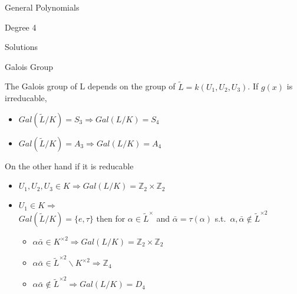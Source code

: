\documentclass[12pt, letterpaper]{article}
\newcommand{\Z}{\mathbb{Z}}
\begin{document}
\begin{section}{General Polynomials}
\begin{subsection}{Degree 4}
\begin{subsubsection}{Solutions}
    \end{subsubsection}

    \begin{subsubsection}{Galois Group}

      The Galois group of L depends on the group of
      \(\tilde{L} = k(U_{1}, U_{2}, U_{3})\). If \(g(x)\) is irreducable,
      \begin{itemize}
        \item \(Gal(\tilde{L} / K) = S_{3} \Rightarrow Gal(L / K) = S_{4}\)
        \item \(Gal(\tilde{L} / K) = A_{3} \Rightarrow Gal(L / K) = A_{4}\)
      \end{itemize}
      On the other hand if it is reducable
      \begin{itemize}
        \item \(U_{1}, U_{2}, U_{3} \in K \Rightarrow Gal(L / K) = \Z_{2}
              \times \Z_{2}\)
        \item \(U_{1} \in K \Rightarrow \) \\
              \(Gal(\tilde{L} / K) = \{e, \tau\}\) then for \(\alpha \in
              \tilde{L}^{\times}\) and \(\bar{\alpha} = \tau(\alpha)\) s.t.\
              \(\alpha, \bar{\alpha} \notin \tilde{L}^{\times 2}\)
              \begin{itemize}
                \item \(\alpha \bar{\alpha} \in K^{\times 2}
                      \Rightarrow Gal(L / K) = \Z_{2} \times \Z_{2}\)
                \item \(\alpha \bar{\alpha} \in \tilde{L}^{\times 2}
                      \backslash K^{\times 2} \Rightarrow \Z_{4}\)
                \item \(\alpha \bar{\alpha} \notin \tilde{L}^{\times 2}
                      \Rightarrow Gal(L / K) = D_{4}\)
              \end{itemize}
      \end{itemize}

    \end{subsubsection}

  \end{subsection}

\end{section}
\end{document}
